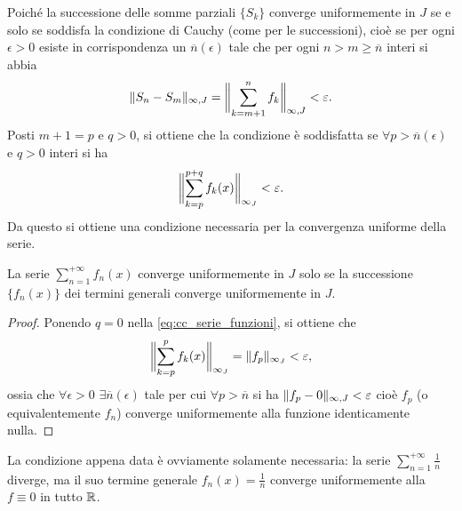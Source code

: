 Poiché la successione delle somme parziali $\{S_k\}$ converge uniformemente in $J$ se e solo se soddisfa la condizione di Cauchy (come per le successioni), cioè se per ogni $\epsilon>0$ esiste in corrispondenza un $\overline{n}(\epsilon)$ tale che per ogni $n>m\geq\overline{n}$ interi si abbia
\[
	\norm{S_n-S_m}_{\infty,J}=\norm[\bigg]{\sum_{k=m+1}^nf_k}_{\infty,J}<\epsilon.
\]
Posti $m+1=p$ e $q>0$, si ottiene che la condizione è soddisfatta se $\forall p>\overline{n}(\epsilon)$ e $q>0$ interi si ha
\begin{equation} \label{eq:cc_serie_funzioni}
	\norm[\bigg]{\sum_{k=p}^{p+q}f_k(x)}_{\infty_J}<\epsilon.
\end{equation}
Da questo si ottiene una condizione necessaria per la convergenza uniforme della serie.
\begin{corollario}
La serie $\sum_{n=1}^{+\infty}f_n(x)$ converge uniformemente in $J$ solo se la successione $\{f_n(x)\}$ dei termini generali converge uniformemente in $J$.
\end{corollario}
\begin{proof}
Ponendo $q=0$ nella \eqref{eq:cc_serie_funzioni}, si ottiene che
\[
	\norm[\bigg]{\sum_{k=p}^{p}f_k(x)}_{\infty_J}=\norm{f_p}_{\infty_J}<\epsilon,
\]
ossia che $\forall\epsilon>0$ $\exists\overline{n}(\epsilon)$ tale per cui $\forall p>\overline{n}$ si ha $\norm{f_p-0}_{\infty,J}<\epsilon$ cioè $f_p$ (o equivalentemente $f_n$) converge uniformemente alla funzione identicamente nulla.
\end{proof}
La condizione appena data è ovviamente solamente necessaria: la serie $\sum_{n=1}^{+\infty}\frac1{n}$ diverge, ma il suo termine generale $f_n(x)=\frac1{n}$ converge uniformemente alla $f\equiv 0$ in tutto $\R$.


